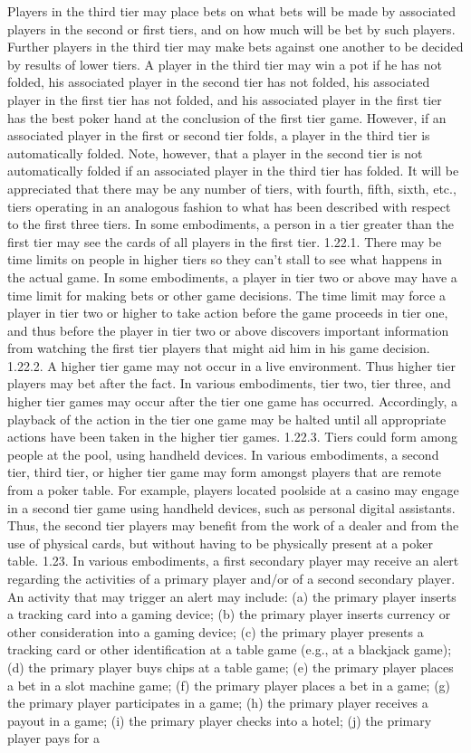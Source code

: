 \documentclass[11pt,a4paper]{article}
\begin{document}
Players in the third tier may place bets on what bets will be made by associated players in the second or first tiers, and on how much will be bet by such players. Further players in the third tier may make bets against one another to be decided by results of lower tiers. A player in the third tier may win a pot if he has not folded, his associated player in the second tier has not folded, his associated player in the first tier has not folded, and his associated player in the first tier has the best poker hand at the conclusion of the first tier game. However, if an associated player in the first or second tier folds, a player in the third tier is automatically folded. Note, however, that a player in the second tier is not automatically folded if an associated player in the third tier has folded. It will be appreciated that there may be any number of tiers, with fourth, fifth, sixth, etc., tiers operating in an analogous fashion to what has been described with respect to the first three tiers. In some embodiments, a person in a tier greater than the first tier may see the cards of all players in the first tier. 1.22.1. There may be time limits on people in higher tiers so they can't stall to see what happens in the actual game. In some embodiments, a player in tier two or above may have a time limit for making bets or other game decisions. The time limit may force a player in tier two or higher to take action before the game proceeds in tier one, and thus before the player in tier two or above discovers important information from watching the first tier players that might aid him in his game decision. 1.22.2. A higher tier game may not occur in a live environment. Thus higher tier players may bet after the fact. In various embodiments, tier two, tier three, and higher tier games may occur after the tier one game has occurred. Accordingly, a playback of the action in the tier one game may be halted until all appropriate actions have been taken in the higher tier games. 1.22.3. Tiers could form among people at the pool, using handheld devices. In various embodiments, a second tier, third tier, or higher tier game may form amongst players that are remote from a poker table. For example, players located poolside at a casino may engage in a second tier game using handheld devices, such as personal digital assistants. Thus, the second tier players may benefit from the work of a dealer and from the use of physical cards, but without having to be physically present at a poker table. 1.23. In various embodiments, a first secondary player may receive an alert regarding the activities of a primary player and/or of a second secondary player. An activity that may trigger an alert may include: (a) the primary player inserts a tracking card into a gaming device; (b) the primary player inserts currency or other consideration into a gaming device; (c) the primary player presents a tracking card or other identification at a table game (e.g., at a blackjack game); (d) the primary player buys chips at a table game; (e) the primary player places a bet in a slot machine game; (f) the primary player places a bet in a game; (g) the primary player participates in a game; (h) the primary player receives a payout in a game; (i) the primary player checks into a hotel; (j) the primary player pays for a 
\end{document}
